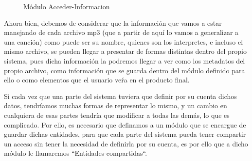 \documentclass[10pt,letterpaper]{report}
\begin{document}
\vspace{0.5cm}

\begin{figure}[H]
\centering


\caption{Módulo Acceder-Informacion}
\label{fig:acceder-informacion-2}
\end{figure}

\vspace{0.5cm}

\noindent Ahora bien, debemos de considerar que la información que vamos a estar manejando de cada archivo mp3 (que a partir de aquí lo vamos a generalizar a una canción) como puede ser su nombre, quienes son los interpretes, e incluso el mismo archivo, se pueden llegar a presentar de formas distintas dentro del propio sistema, pues dicha información la podremos llegar a ver como los metadatos del propio archivo, como información que se guarda dentro del módulo definido para ello o como elementos que el usuario veŕa en el producto final.

\vspace{0.2cm}

\noindent Si cada vez que una parte del sistema tuviera que definir por su cuenta dichos datos, tendríamos muchas formas de representar lo mismo, y un cambio en cualquiera de esas partes tendría que modificar a todas las demás, lo que es complicado. Por ello, es necesario que definamos a un módulo que se encargue de guardar dichas entidades, para que cada parte del sistema pueda tener compartir un acceso sin tener la necesidad de definirla por su cuenta, es por ello que a dicho módulo le llamaremos ``Entidades-compartidas``.
\end{document}
